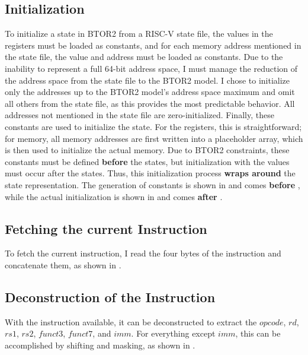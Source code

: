 \subsection{Initialization}\label{sec:initialization}
To initialize a state in BTOR2 from a RISC-V state file, the values
in the registers must be loaded as constants, and for each memory
address mentioned in the state file, the value and address must be
loaded as constants. Due to the inability to represent a full 64-bit
address space, I must manage the reduction of the address space from
the state file to the BTOR2 model. I chose to initialize only the
addresses up to the BTOR2 model's address space maximum and omit all
others from the state file, as this provides the most predictable
behavior. All addresses not mentioned in the state file are
zero-initialized. Finally, these constants are used to initialize the
state. For the registers, this is straightforward; for memory, all
memory addresses are first written into a placeholder array, which is
then used to initialize the actual memory. Due to BTOR2 constraints,
these constants must be defined \textbf{before} the states, but
initialization with the values must occur after the states. Thus,
this initialization process \textbf{wraps around} the state
representation. The generation of constants is shown in
 and comes \textbf{before}
, while the actual initialization is shown in
 and comes \textbf{after} .




\subsection{Fetching the current Instruction}
To fetch the current instruction, I read the four bytes of the
instruction and concatenate them, as shown in .


\subsection{Deconstruction of the Instruction}
With the instruction available, it can be deconstructed to extract
the $opcode$, $rd$, $rs1$, $rs2$, $funct3$, $funct7$, and $imm$. For
everything except $imm$, this can be accomplished by shifting and
masking, as shown in .

